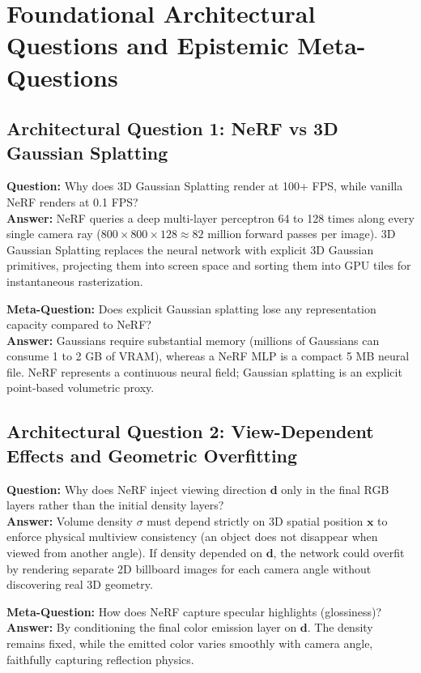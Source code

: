 \documentclass[11pt,a4paper]{article}
\theoremstyle{definition}
\begin{document}
\section{Foundational Architectural Questions and Epistemic Meta-Questions}

\subsection{Architectural Question 1: NeRF vs 3D Gaussian Splatting}
\textbf{Question:} Why does 3D Gaussian Splatting render at 100+ FPS, while vanilla NeRF renders at 0.1 FPS?\\
\textbf{Answer:} NeRF queries a deep multi-layer perceptron 64 to 128 times along every single camera ray ($800 \times 800 \times 128 \approx 82 \text{ million}$ forward passes per image). 3D Gaussian Splatting replaces the neural network with explicit 3D Gaussian primitives, projecting them into screen space and sorting them into GPU tiles for instantaneous rasterization.

\textbf{Meta-Question:} Does explicit Gaussian splatting lose any representation capacity compared to NeRF?\\
\textbf{Answer:} Gaussians require substantial memory (millions of Gaussians can consume 1 to 2 GB of VRAM), whereas a NeRF MLP is a compact 5 MB neural file. NeRF represents a continuous neural field; Gaussian splatting is an explicit point-based volumetric proxy.

\subsection{Architectural Question 2: View-Dependent Effects and Geometric Overfitting}
\textbf{Question:} Why does NeRF inject viewing direction $\mathbf{d}$ only in the final RGB layers rather than the initial density layers?\\
\textbf{Answer:} Volume density $\sigma$ must depend strictly on 3D spatial position $\mathbf{x}$ to enforce physical multiview consistency (an object does not disappear when viewed from another angle). If density depended on $\mathbf{d}$, the network could overfit by rendering separate 2D billboard images for each camera angle without discovering real 3D geometry.

\textbf{Meta-Question:} How does NeRF capture specular highlights (glossiness)?\\
\textbf{Answer:} By conditioning the final color emission layer on $\mathbf{d}$. The density remains fixed, while the emitted color varies smoothly with camera angle, faithfully capturing reflection physics.
\end{document}
